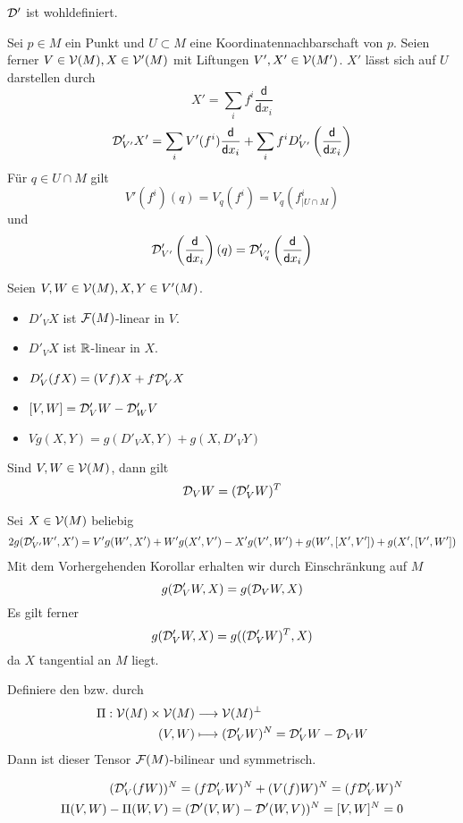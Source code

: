 \documentclass{article}
\renewcommand{\d}{\textsf{d}}
\begin{document}
\Lem{}
$\mathcal{D}'$ ist wohldefiniert.
\begin{Beweis}{}
Sei $p \in M$ ein Punkt und $U \subset M$ eine Koordinatennachbarschaft von $p$. Seien ferner $V \in \mathcal{V}(M), X \in \mathcal{V}'(M)$ mit Liftungen $V',X' \in \mathcal{V}(M')$. $X'$ lässt sich auf $U$ darstellen durch
\[ X' = \sum_{i} f^i \frac{\d}{\d x_i} \]
\[ \D'_{V'}X' = \sum_i V'(f^i) \frac{\d}{\d x_i} + \sum_i f^i D'_{V'}\klam{\frac{\d}{\d x_i}} \]
Für $q \in U\cap M$ gilt
\[V'(f^i)(q) = V_q(f^i) = V_q(f^i_{|U\cap M}) \]
und
\[ \D'_{V'}\klam{\frac{\d}{\d x_i}}(q) = \D'_{V'_q}\klam{\frac{\d}{\d x_i}} \]
\end{Beweis}
\Kor{}
Seien $V,W \in \mathcal{V}(M), X,Y \in V'(M)$.
\begin{itemize}
\item $D'_VX$ ist $\mathcal{F}(M)$-linear in $V$.
\item $D'_VX$ ist $\mathbb{R}$-linear in $X$.
\item $D'_V(fX) = (Vf) X + f\mathcal{D}'_VX$
\item $[V,W] = \mathcal{D}'_VW - \mathcal{D}'_WV$
\item $Vg(X,Y) = g(D'_VX, Y) + g(X, D'_VY)$
\end{itemize}
\Lem{}
Sind $V,W \in \mathcal{V}(M)$, dann gilt
\[ \mathcal{D}_VW = (\mathcal{D}'_VW)^T \]
\begin{Beweis}{}
Sei $X \in \mathcal{V}(M)$ beliebig
\begin{align*}
2g(\mathcal{D}'_{V'}W', X') = V'g(W',X') + W'g(X',V') - X'g(V',W') + g(W',[X',V']) + g(X', [V',W'])
\end{align*}
Mit dem Vorhergehenden Korollar erhalten wir durch Einschränkung auf $M$
\[ g(\mathcal{D}'_{V}W, X) = g(\mathcal{D}_{V}W, X) \]
Es gilt ferner
\[ g(\mathcal{D}'_{V}W, X) = g((\mathcal{D}'_{V}W)^T, X) \]
da $X$ tangential an $M$ liegt.
\end{Beweis}

\Lem{}
Definiere den  bzw.  durch
\begin{align*}
\Pi : \mathcal{V}(M) \times \mathcal{V}(M) &\overset{}{\longrightarrow} \mathcal{V}(M)^\bot\\
(V,W) & \longmapsto (\mathcal{D}'_VW)^N = \mathcal{D}'_VW - \mathcal{D}_VW
\end{align*}
Dann ist dieser Tensor $\mathcal{F}(M)$-bilinear und symmetrisch.
\begin{Beweis}{}
\begin{align*}
(\mathcal{D}'_V(fW))^N = (f\mathcal{D}'_VW)^N + (V(f) W)^N = (f\mathcal{D}'_VW)^N\\
\Pi(V,W) - \Pi(W,V) = (\mathcal{D}'(V,W) - \mathcal{D}'(W,V))^N = [V,W]^N = 0
\end{align*}
\end{Beweis}
\end{document}
